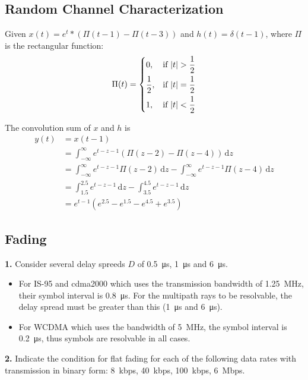 \documentclass[a4paper,12pt]{article}
\newcommand{\ud}{\,\mathrm{d}}
\newcommand{\problem}[1]{\noindent\textbf{#1.}}
\begin{document}
\subsection{Random Channel Characterization}
Given $x(t) = e^t * (\Pi(t - 1) - \Pi(t - 3))$ and $h(t) = \delta(t - 1)$,
where $\Pi$ is the rectangular function:
\[\Pi(t) = \begin{dcases}
  0, &\text{if }|t| > \frac{1}{2}\\
  \frac{1}{2}, &\text{if }|t| = \frac{1}{2}\\
  1, &\text{if }|t| < \frac{1}{2}\\
\end{dcases}\]

The convolution sum of $x$ and $h$ is
\begin{align*}
  y(t) &= x(t - 1)\\
  &= \int_{-\infty}^\infty e^{t-z-1}(\Pi(z-2) - \Pi(z-4))\ud z\\
  &= \int_{-\infty}^\infty e^{t-z-1}\Pi(z-2)\ud z
   - \int_{-\infty}^\infty e^{t-z-1}\Pi(z-4)\ud z\\
  &= \int_{1.5}^{2.5} e^{t-z-1}\ud z
   - \int_{3.5}^{4.5} e^{t-z-1}\ud z\\
  &= e^{t-1}\left(e^{2.5} - e^{1.5} - e^{4.5} + e^{3.5}\right)
\end{align*}

\subsection{Fading}
\problem 1  Consider several delay spreeds $D$ of \SI{0.5}{\micro\second},
\SI{1}{\micro\second} and \SI{6}{\micro\second}.

\begin{itemize}
  \item For IS-95 and cdma2000 which uses the transmission bandwidth of
    \SI{1.25}{\mega\hertz}, their symbol interval is \SI{0.8}{\micro\second}.
    For the multipath rays to be resolvable, the delay spread must be
    greater than this (\SI{1}{\micro\second} and \SI{6}{\micro\second}).
  \item For WCDMA which uses the bandwidth of \SI{5}{\mega\hertz},
    the symbol interval is \SI{0.2}{\micro\second}, thus symbols
    are resolvable in all cases.
\end{itemize}

\problem 2  Indicate the condition for flat fading for each of the following
data rates with transmission in binary form: \SI{8}{kbps}, \SI{40}{kbps},
\SI{100}{kbps}, \SI{6}{Mbps}.
\end{document}
